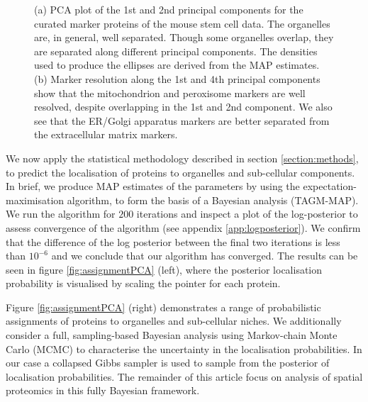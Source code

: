 \documentclass[12pt,english]{article}\usepackage[]{graphicx}\usepackage[]{color}
\newenvironment{knitrout}{}{} %
\begin{document}
\begin{figure}[ht]
\begin{subfigure}[t]{0.45\textwidth}
\begin{knitrout}
\end{knitrout}
        \caption{}
\end{subfigure}
  \centering
  \caption{ (a) PCA plot of the 1st and 2nd principal components for
    the curated marker proteins of the mouse stem cell data. The
    organelles are, in general, well separated. Though some organelles
    overlap, they are separated along different principal
    components. The densities used to produce the ellipses are derived
    from the MAP estimates. (b) Marker resolution along the 1st and
    4th principal components show that the mitochondrion and
    peroxisome markers are well resolved, despite overlapping in the
    1st and 2nd component.  We also see that the ER/Golgi apparatus
    markers are better separated from the extracellular matrix
    markers.}
\label{figure::pcaellipse}
\end{figure}





We now apply the statistical methodology described in section
\ref{section:methods}, to predict the localisation of proteins to
organelles and sub-cellular components. In brief, we produce MAP
estimates of the parameters by using the expectation-maximisation
algorithm, to form the basis of a Bayesian analysis (TAGM-MAP).  We
run the algorithm for $200$ iterations and inspect a plot of the
log-posterior to assess convergence of the algorithm (see appendix
\ref{app:logposterior}). We confirm that the difference of the log
posterior between the final two iterations is less than $10^{-6}$ and
we conclude that our algorithm has converged. The results can be seen
in figure \ref{fig:assignmentPCA} (left), where the posterior localisation
probability is visualised by scaling the pointer for each protein.

Figure \ref{fig:assignmentPCA} (right) demonstrates a range of
probabilistic assignments of proteins to organelles and sub-cellular
niches. We additionally consider a full, sampling-based Bayesian
analysis using Markov-chain Monte Carlo (MCMC) to characterise the
uncertainty in the localisation probabilities.  In our case a
collapsed Gibbs sampler is used to sample from the posterior of
localisation probabilities. The remainder of this article focus on
analysis of spatial proteomics in this fully Bayesian framework.
\end{document}
